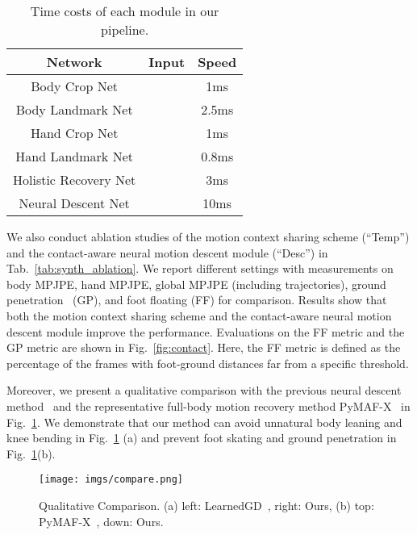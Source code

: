 \documentclass[10pt,twocolumn,letterpaper]{article}
\begin{document}
\begin{table}[ht!]
\caption{Time costs of each module in our pipeline.}
\centering
\begin{tabular}{ccc}
\hline
Network & Input &Speed \\ \hline
Body Crop Net & &  1ms \\
Body Landmark Net &  & 2.5ms \\ 
Hand Crop Net &  & 1ms \\
Hand Landmark Net &  & 0.8ms \\ 
Holistic Recovery Net &  & 3ms \\ 
Neural Descent Net &  & 10ms \\ \hline
\end{tabular}
\vspace{-3mm}
\label{tab:performance}
\end{table}

We also conduct ablation studies of the motion context sharing scheme (``Temp'') and the contact-aware neural motion descent module (``Desc'') in Tab.~\ref{tab:synth_ablation}. 
We report different settings with measurements on body MPJPE, hand MPJPE, global MPJPE (including trajectories), ground penetration~\cite{yuan2021simpoe} (GP), and foot floating (FF) for comparison.
Results show that both the motion context sharing scheme and the contact-aware neural motion descent module improve the performance. Evaluations on the FF metric and the GP metric are shown in Fig.~\ref{fig:contact}. Here, the FF metric is defined as the percentage of the frames with foot-ground distances far from a specific threshold.


Moreover, we present a qualitative comparison with the previous neural descent method~\cite{song2020human} and the representative full-body motion recovery method PyMAF-X~\cite{pymafx2022} in Fig.~\ref{fig:descent_compare}.
We demonstrate that our method can avoid unnatural body leaning and knee bending in Fig.~\ref{fig:descent_compare} (a) and prevent foot skating and ground penetration in Fig.~\ref{fig:descent_compare}(b).








\begin{figure}[ht!]
    \centering
    \texttt{[image: imgs/compare.png]}
    \caption{Qualitative Comparison. (a) left: LearnedGD~\cite{song2020human}, right: Ours, (b) top: PyMAF-X~\cite{pymafx2022}, down: Ours.
}
    \vspace{-2mm}
    \label{fig:descent_compare}
\end{figure}
\end{document}
